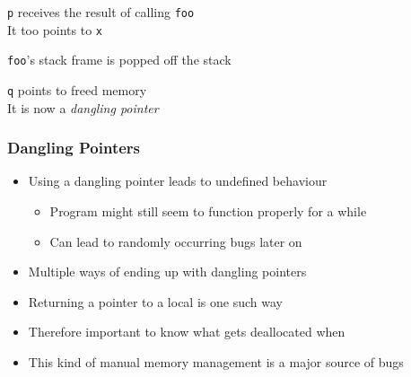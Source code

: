 \begin{frame}
\begin{overprint}
    \begin{center}
      \texttt{p} receives the result of calling \texttt{foo} \\
      It too points to \texttt{x}
    \end{center}

    \begin{center}
      \texttt{foo}'s stack frame is popped off the stack
    \end{center}

    \begin{center}
      \texttt{q} points to freed memory \\
      It is now a \emph{dangling pointer}
    \end{center}
  \end{overprint}
\end{frame}

\begin{frame}
  \frametitle{Dangling Pointers}
  \begin{itemize}
    \item Using a dangling pointer leads to undefined behaviour
          \begin{itemize}
            \item Program might still seem to function properly for a while
            \item Can lead to randomly occurring bugs later on
          \end{itemize}
    \item Multiple ways of ending up with dangling pointers
    \item Returning a pointer to a local is one such way
    \item Therefore important to know what gets deallocated when
    \item This kind of manual memory management is a major source of bugs
  \end{itemize}
\end{frame}


